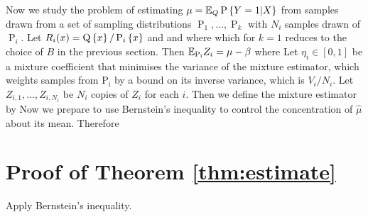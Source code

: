Now we study the problem of estimating $\mu = \mathbb E_Q \operatorname{P}\left\{Y = 1|X\right\}$ from samples drawn
from a set of sampling distributions $\operatorname{P}_1,\ldots,\operatorname{P}_k$ with $N_i$ samples
drawn of $\operatorname{P}_i$.
Let $R_i(x) = \operatorname{Q}\left\{x\right\} / \operatorname{P}_{i}\left\{x\right\}$ and
and
where
which for $k = 1$ reduces to the choice of $B$ in the previous section.
Then $\mathbb E_{\operatorname{P_i}} Z_i = \mu - \beta$ where
Let $\eta_i \in [0,1]$ be a mixture coefficient that minimises the variance of the mixture 
estimator, which weights samples from $\operatorname{P_i}$ by a bound on its inverse variance, which is $V_i / N_i$.
Let $Z_{i,1},\ldots,Z_{i,N_i}$ be $N_i$ copies of $Z_i$ for each $i$.
Then we define the mixture estimator by
Now we prepare to use Bernstein's inequality to control the concentration of $\hat \mu$ about its mean.
Therefore


\section*{Proof of Theorem \ref{thm:estimate}}\label{sec:thm:estimate}

Apply Bernstein's inequality.















